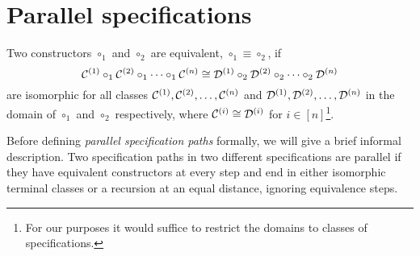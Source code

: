 \section{Parallel specifications}
\begin{definition}
Two constructors $\circ_1$ and $\circ_2$ are equivalent, $\circ_1 \equiv \circ_2$, if
\[
    \mathcal{C}^{\left(1\right)} \circ_1 \mathcal{C}^{\left(2\right)} \circ_1 \dotsm \circ_1 \mathcal{C}^{\left(n\right)} \cong \mathcal{D}^{\left(1\right)} \circ_2 \mathcal{D}^{\left(2\right)} \circ_2 \dotsm \circ_2 \mathcal{D}^{\left(n\right)}
\]
are isomorphic for all classes $\mathcal{C}^{\left(1\right)},\mathcal{C}^{\left(2\right)},\dotsc,\mathcal{C}^{\left(n\right)}$ and $\mathcal{D}^{\left(1\right)},\mathcal{D}^{\left(2\right)},\dotsc,\mathcal{D}^{\left(n\right)}$ in the domain of $\circ_1$ and $\circ_2$ respectively, where $\mathcal{C}^{\left(i\right)}\cong\mathcal{D}^{\left(i\right)}$ for $i \in [n]$\footnote{For our purposes it would suffice to restrict the domains to classes of specifications.}.
\end{definition}

Before defining \emph{parallel specification paths} formally, we will give a brief informal description. Two specification paths in two different specifications are parallel if they have equivalent constructors at every step and end in either isomorphic terminal classes or a recursion at an equal distance, ignoring equivalence steps.

